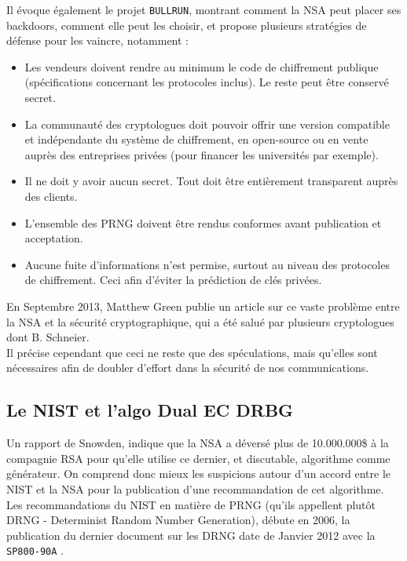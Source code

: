 	Il évoque également le projet \texttt{BULLRUN}, montrant comment la NSA peut placer ses backdoors, comment elle peut les choisir, et propose plusieurs stratégies de défense \cite{schneier2013NSA} pour les vaincre, notamment : 
	\begin{itemize}
	\item Les vendeurs doivent rendre au minimum le code de chiffrement publique (spécifications concernant les protocoles inclus). Le reste peut être conservé secret.
	\item La communauté des cryptologues doit pouvoir offrir une version compatible et indépendante du système de chiffrement, en open-source ou en vente auprès des entreprises privées (pour financer les universités par exemple).
	\item Il ne doit y avoir aucun secret. Tout doit être entièrement transparent auprès des clients. 
	\item L'ensemble des PRNG doivent être rendus conformes avant publication et acceptation.
	\item Aucune fuite d'informations n'est permise, surtout au niveau des protocoles de chiffrement. Ceci afin d'éviter la prédiction de clés privées.\\
	\end{itemize}
	
	En Septembre 2013, Matthew Green publie un article \cite{green2013NSA} sur ce vaste problème entre la NSA et la sécurité cryptographique, qui a été salué par plusieurs cryptologues dont B. Schneier.\\
	
	Il précise cependant que ceci ne reste que des spéculations, mais qu'elles sont nécessaires afin de doubler d'effort dans la sécurité de nos communications.\\


	\subsection{Le NIST et l'algo Dual EC DRBG}
	
	Un rapport de Snowden, indique que la NSA a déversé plus de 10.000.000\$ à la compagnie RSA \cite{ravi2013NSA} pour qu'elle utilise ce dernier, et discutable, algorithme comme générateur. On comprend donc mieux les suspicions autour d'un accord entre le NIST et la NSA pour la publication d'une recommandation de cet algorithme.\\	
	
	Les recommandations du NIST en matière de PRNG (qu'ils appellent plutôt DRNG - Determinist Random Number Generation), débute en 2006, la publication du dernier document sur les DRNG date de Janvier 2012 avec la \texttt{SP800-90A} \cite{nist800-90A}.\\

